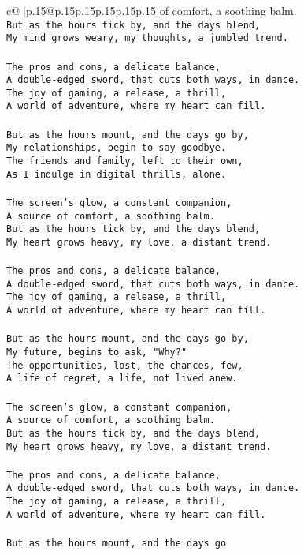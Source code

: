 \documentclass{article}
\begin{document}
{\begin{supertabular}{c@{$\;$}|p{.15\linewidth}@{}p{.15\linewidth}p{.15\linewidth}p{.15\linewidth}p{.15\linewidth}p{.15\linewidth}}
{{{of comfort, a soothing balm.\\ \tt But as the hours tick by, and the days blend,\\ \tt My mind grows weary, my thoughts, a jumbled trend.\\ \tt \\ \tt The pros and cons, a delicate balance,\\ \tt A double-edged sword, that cuts both ways, in dance.\\ \tt The joy of gaming, a release, a thrill,\\ \tt A world of adventure, where my heart can fill.\\ \tt \\ \tt But as the hours mount, and the days go by,\\ \tt My relationships, begin to say goodbye.\\ \tt The friends and family, left to their own,\\ \tt As I indulge in digital thrills, alone.\\ \tt \\ \tt The screen's glow, a constant companion,\\ \tt A source of comfort, a soothing balm.\\ \tt But as the hours tick by, and the days blend,\\ \tt My heart grows heavy, my love, a distant trend.\\ \tt \\ \tt The pros and cons, a delicate balance,\\ \tt A double-edged sword, that cuts both ways, in dance.\\ \tt The joy of gaming, a release, a thrill,\\ \tt A world of adventure, where my heart can fill.\\ \tt \\ \tt But as the hours mount, and the days go by,\\ \tt My future, begins to ask, "Why?"\\ \tt The opportunities, lost, the chances, few,\\ \tt A life of regret, a life, not lived anew.\\ \tt \\ \tt The screen's glow, a constant companion,\\ \tt A source of comfort, a soothing balm.\\ \tt But as the hours tick by, and the days blend,\\ \tt My heart grows heavy, my love, a distant trend.\\ \tt \\ \tt The pros and cons, a delicate balance,\\ \tt A double-edged sword, that cuts both ways, in dance.\\ \tt The joy of gaming, a release, a thrill,\\ \tt A world of adventure, where my heart can fill.\\ \tt \\ \tt But as the hours mount, and the days go }}}
\end{supertabular}}
\end{document}
